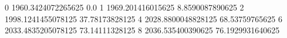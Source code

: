 0 1960.3424072265625 0.0
1 1969.201416015625 8.8590087890625
2 1998.1241455078125 37.78173828125
4 2028.8800048828125 68.53759765625
6 2033.4835205078125 73.14111328125
8 2036.535400390625 76.1929931640625

